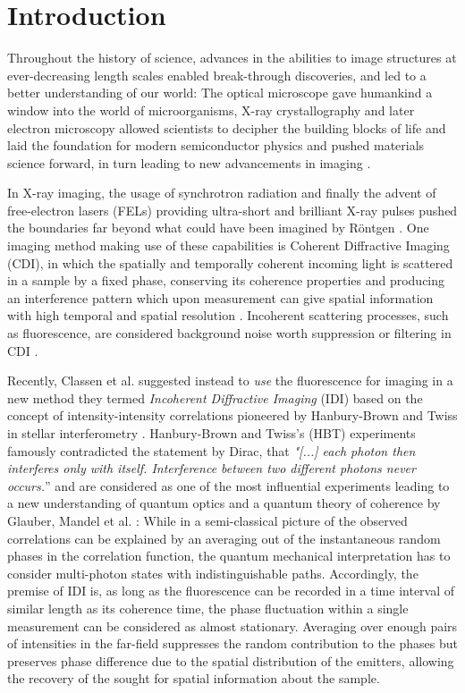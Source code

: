 \chapter{Introduction}
Throughout the history of science, advances in the abilities to image structures at ever-decreasing length scales enabled break-through discoveries, and led to a better understanding of our world:
The optical microscope gave humankind a window into the world of microorganisms, X-ray crystallography and later electron microscopy allowed scientists to decipher the building blocks of life and laid the foundation for modern semiconductor physics and pushed materials science forward, in turn leading to new advancements in imaging \cite{hooke1665,laue1915,ruska1939,watson1953,hovmoeller1984}.

In X-ray imaging, the usage of synchrotron radiation and finally the advent of free-electron lasers (FELs) providing ultra-short and brilliant X-ray pulses pushed the boundaries far beyond what could have been imagined by Röntgen \cite{cloetens1996,emma2010}. One imaging method making use of these capabilities is Coherent Diffractive Imaging (CDI), in which the spatially and temporally coherent incoming light is scattered in a sample by a fixed phase, conserving its coherence properties and producing an interference pattern which upon measurement can give spatial information with high temporal and spatial resolution \cite{seibert2011,bostedt2010,barke2015}. Incoherent scattering processes, such as fluorescence, are considered background noise worth suppression or filtering in CDI \cite{schultz2013chapter7}. 

Recently, Classen et al. suggested instead to \textit{use} the fluorescence for imaging in a new method they termed \textit{Incoherent Diffractive Imaging} (IDI) based on the concept of intensity-intensity correlations pioneered by Hanbury-Brown and Twiss in stellar interferometry \cite{classen2017,hanbury1956}.  Hanbury-Brown and Twiss's (HBT) experiments famously contradicted the statement by Dirac, that \textit{"[...] each photon then interferes only with itself. Interference between two different photons never occurs.}” \cite{dirac1958} and are considered as one of the most influential experiments leading to a new understanding of quantum optics and a quantum theory of coherence by Glauber, Mandel et al. \cite{glauber1963,mandel1959, hong1987,glauber2006}: While in a semi-classical picture of the observed correlations can be explained by an averaging out of the instantaneous random phases in the correlation function, the quantum mechanical interpretation has to consider multi-photon states with indistinguishable paths. Accordingly, the premise of IDI is, as long as the fluorescence can be recorded in a time interval of similar length as its coherence time, the phase fluctuation within a single measurement can be considered as almost stationary. Averaging over enough pairs of intensities in the far-field suppresses the random contribution to the phases but preserves phase difference due to the spatial distribution of the emitters,   allowing the recovery of the sought for spatial information about the sample.

